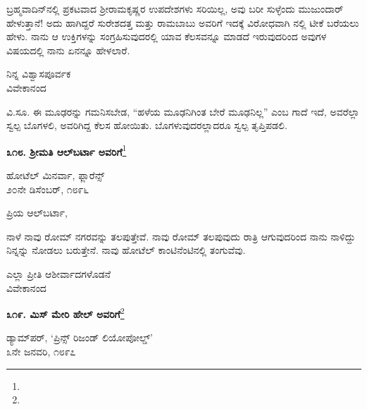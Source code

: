 ಬ್ರಹ್ಮವಾದಿನ್‌ನಲ್ಲಿ ಪ್ರಕಟವಾದ ಶ‍್ರೀರಾಮಕೃಷ್ಣರ ಉಪದೇಶಗಳು ಸರಿಯಿಲ್ಲ, ಅವು ಬರೀ ಸುಳ್ಳೆಂದು ಮುಜುಂದಾರ್ ಹೇಳುತ್ತಾನೆ! ಅದು ಹಾಗಿದ್ದರೆ ಸುರೇಶದತ್ತ ಮತ್ತು ರಾಮಬಾಬು ಅವರಿಗೆ ಇದಕ್ಕೆ ವಿರೋಧವಾಗಿ  ನಲ್ಲಿ ಟೀಕೆ ಬರೆಯಲು ಹೇಳು. ನಾನು ಆ ಉಕ್ತಿಗಳನ್ನು ಸಂಗ್ರಹಿಸುವುದರಲ್ಲಿ ಯಾವ ಕೆಲಸವನ್ನೂ ಮಾಡದೆ ಇರುವುದರಿಂದ ಅವುಗಳ ವಿಷಯದಲ್ಲಿ ನಾನು ಏನನ್ನೂ ಹೇಳಲಾರೆ.

\vspace{-0.5cm}

\begin{flushright}
ನಿನ್ನ ವಿಶ್ವಾಸಪೂರ್ವಕ\\ವಿವೇಕಾನಂದ
\end{flushright}

\vspace{-0.35cm}

ವಿ.ಸೂ.\enginline{-} ಈ ಮೂಢರನ್ನು ಗಮನಿಸಬೇಡ, ``ಹಳೆಯ ಮೂಢನಿಗಿಂತ ಬೇರೆ ಮೂಢನಿಲ್ಲ” ಎಂಬ ಗಾದೆ ಇದೆ, ಅವರೆಲ್ಲಾ ಸ್ವಲ್ಪ ಬೊಗಳಲಿ, ಅವರಿಗಿದ್ದ ಕೆಲಸ ಹೋಯಿತು. ಬೊಗಳುವುದರಲ್ಲಾದರೂ ಸ್ವಲ್ಪ ತೃಪ್ತಿಪಡಲಿ.

\begin{center}
\textbf{೩೧೮. ಶ‍್ರೀಮತಿ ಆಲ್‌ಬರ್ಟಾ ಅವರಿಗೆ}\footnote{}
\end{center}

\vspace{-0.7cm}

\begin{flushright}
ಹೋಟೆಲ್ ಮಿನರ್ವಾ, ಫ್ಲಾರೆನ್ಸ್\\೨೦ನೇ ಡಿಸೆಂಬರ್, ೧೮೯೬
\end{flushright}

\vspace{-0.3cm}

\noindent
ಪ್ರಿಯ ಆಲ್‌ಬರ್ಟಾ,

ನಾಳೆ ನಾವು ರೋಮ್ ನಗರವನ್ನು ತಲಪುತ್ತೇವೆ. ನಾವು ರೋಮ್ ತಲಪುವುದು ರಾತ್ರಿ ಆಗುವುದರಿಂದ ನಾನು ನಾಳಿದ್ದು ನಿನ್ನನ್ನು ನೋಡಲು ಬರುತ್ತೇನೆ. ನಾವು ಹೋಟೆಲ್ ಕಾಂಟಿನೆಂಟಿನಲ್ಲಿ ತಂಗುವೆವು.

\vspace{-0.5cm}

{\flushright
ಎಲ್ಲಾ ಪ್ರೀತಿ ಆಶೀರ್ವಾದಗಳೊಡನೆ\\ವಿವೇಕಾನಂದ\par}

\begin{center}
\textbf{೩೧೯. ಮಿಸ್ ಮೇರಿ ಹೇಲ್‌ ಅವರಿಗೆ}\footnote{}
\end{center}

\vspace{-0.5cm}

\begin{flushright}
ಡ್ಯಾಮ್‌ಪರ್, ‘ಪ್ರಿನ್ಸ್ ರಿಜಂಡ್ ಲಿಯೋಪೋಲ್ಡ್’\\೩ನೇ ಜನವರಿ, ೧೮೯೭
\end{flushright}

